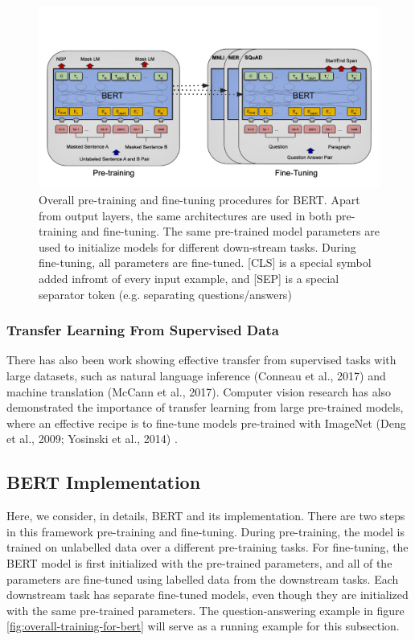 \documentclass{report}
\begin{document}
\begin{figure}
	\includegraphics{images/bert/overall-pre-training-and-fine-tuning-procedures.jpg}
	\caption{Overall pre-training and fine-tuning procedures for BERT. Apart from output layers, the same architectures are used in both pre-training and fine-tuning. The same pre-trained model parameters are used to initialize models for different down-stream tasks. During fine-tuning, all parameters are fine-tuned. [CLS] is a special symbol added infromt of every input example, and [SEP] is a special separator token (e.g. separating questions/answers)}
	\label{fig:overall-training-procedure-for-bert}
\end{figure}

\subsubsection{Transfer Learning From Supervised Data}
\label{sssec:bert-transfer-learning}
There has also been work showing effective transfer from supervised tasks with large datasets, such as natural language inference (Conneau et al., 2017) and machine translation (McCann et al., 2017). Computer vision research has also demonstrated the importance of transfer learning from large pre-trained models, where an effective recipe is to fine-tune models pre-trained with ImageNet (Deng et al., 2009; Yosinski et al., 2014) .

\subsection{BERT Implementation}
\label{ssec:bert-implementation}
Here, we consider, in details, BERT and its implementation. There are two steps in this framework pre-training and fine-tuning. During pre-training, the model is trained on unlabelled data over a different pre-training tasks. For fine-tuning, the BERT model is first initialized with the pre-trained parameters, and all of the parameters are fine-tuned using labelled data from the downstream tasks. Each downstream task has separate fine-tuned models, even though they are initialized with the same pre-trained parameters. The question-answering example in figure \ref{fig:overall-training-for-bert} will serve as a running example for this subsection.
\end{document}
